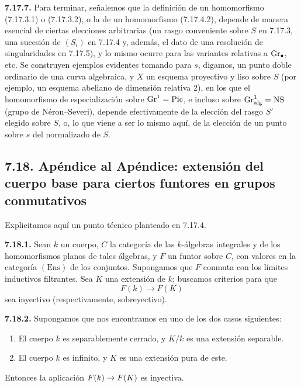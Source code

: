 \textbf{7.17.7.} Para terminar, señalemos que la definición de un homomorfismo (7.17.3.1) o (7.17.3.2), o la de un homomorfismo (7.17.4.2), depende de manera esencial de ciertas elecciones arbitrarias (un rasgo conveniente sobre \(S\) en 7.17.3, una sucesión de \((S_i)\) en 7.17.4 y, además, el dato de una resolución de singularidades en 7.17.5), y lo mismo ocurre para las variantes relativas a \(\Gr_\bullet\), etc. Se construyen ejemplos evidentes tomando para \(s\), digamos, un punto doble ordinario de una curva algebraica, y \(X\) un esquema proyectivo y liso sobre \(S\) (por ejemplo, un esquema abeliano de dimensión relativa 2), en los que el homomorfismo de especialización sobre \(\Gr^1=\Pic\), e incluso sobre \(\Gr^1_{\mathrm{alg}}=\mathrm{NS}\) (grupo de Néron--Severi), depende efectivamente de la elección del rasgo \(S'\) elegido sobre \(S\), o, lo que viene a ser lo mismo aquí, de la elección de un punto sobre \(s\) del normalizado de \(S\).

\subsection*{7.18. Apéndice al Apéndice: extensión del cuerpo base para ciertos funtores en grupos conmutativos}
Explicitamos aquí un punto técnico planteado en 7.17.4.

\textbf{7.18.1.} Sean \(k\) un cuerpo, \(C\) la categoría de las \(k\)-álgebras integrales y de los homomorfismos planos de tales álgebras, y \(F\) un funtor sobre \(C\), con valores en la categoría \((\mathrm{Ens})\) de los conjuntos. Supongamos que \(F\) conmuta con los límites inductivos filtrantes. Sea \(K\) una extensión de \(k\); buscamos criterios para que
\[
  F(k)\longrightarrow F(K)
\]
sea inyectivo (respectivamente, sobreyectivo).

\textbf{7.18.2.} Supongamos que nos encontramos en uno de los dos casos siguientes:
\begin{enumerate}[label=\alph*)]
\item El cuerpo \(k\) es separablemente cerrado, y \(K/k\) es una extensión separable.
\item El cuerpo \(k\) es infinito, y \(K\) es una extensión pura de este.
\end{enumerate}
Entonces la aplicación \(F(k)\to \sisi{K(K)}{F(K)}\) es inyectiva. %

